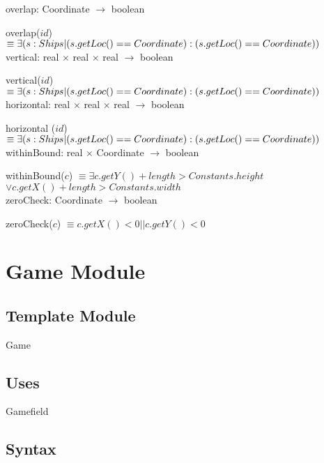 \documentclass[12pt,fleqn]{article}
\begin{document}
    \noindent overlap: Coordinate $\rightarrow$ boolean 

    \noindent overlap($id$) $\equiv  \exists (s : Ships | \mbox(s.getLoc() == Coordinate) : \mbox (s.getLoc() == Coordinate))$ \\

    \noindent vertical: real $\times$ real $\times$ real  $\rightarrow$ boolean  

    \noindent vertical($id$) $\equiv \exists (s : Ships | \mbox(s.getLoc() == Coordinate) : \mbox (s.getLoc() == Coordinate))$ \\

    \noindent horizontal: real $\times$ real $\times$ real  $\rightarrow$ boolean  

    \noindent horizontal ($id$) $\equiv \exists (s : Ships | \mbox(s.getLoc() == Coordinate) : \mbox (s.getLoc() == Coordinate))$ \\

    \noindent withinBound: real  $\times$ Coordinate  $\rightarrow$ boolean  

    \noindent withinBound($c$) $\equiv \exists c.getY() + length > Constants.height$ $\lor c.getX() + length > Constants.width$\\

    \noindent zeroCheck: Coordinate $\rightarrow$ boolean  

    \noindent zeroCheck($c$) $\equiv c.getX() < 0 || c.getY() < 0$ \\

\newpage


\section* {Game Module}

    \subsection* {Template Module}

    Game

    \subsection* {Uses}

    Gamefield

    \subsection* {Syntax}
\end{document}
